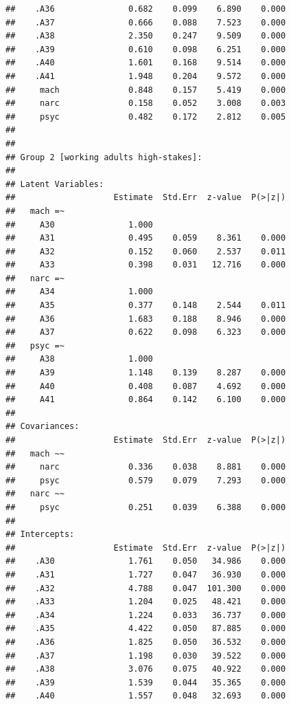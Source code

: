 \documentclass[
  english,
  man]{apa6}
\begin{document}
\begin{verbatim}
##    .A36               0.682    0.099    6.890    0.000
##    .A37               0.666    0.088    7.523    0.000
##    .A38               2.350    0.247    9.509    0.000
##    .A39               0.610    0.098    6.251    0.000
##    .A40               1.601    0.168    9.514    0.000
##    .A41               1.948    0.204    9.572    0.000
##     mach              0.848    0.157    5.419    0.000
##     narc              0.158    0.052    3.008    0.003
##     psyc              0.482    0.172    2.812    0.005
## 
## 
## Group 2 [working adults high-stakes]:
## 
## Latent Variables:
##                    Estimate  Std.Err  z-value  P(>|z|)
##   mach =~                                             
##     A30               1.000                           
##     A31               0.495    0.059    8.361    0.000
##     A32               0.152    0.060    2.537    0.011
##     A33               0.398    0.031   12.716    0.000
##   narc =~                                             
##     A34               1.000                           
##     A35               0.377    0.148    2.544    0.011
##     A36               1.683    0.188    8.946    0.000
##     A37               0.622    0.098    6.323    0.000
##   psyc =~                                             
##     A38               1.000                           
##     A39               1.148    0.139    8.287    0.000
##     A40               0.408    0.087    4.692    0.000
##     A41               0.864    0.142    6.100    0.000
## 
## Covariances:
##                    Estimate  Std.Err  z-value  P(>|z|)
##   mach ~~                                             
##     narc              0.336    0.038    8.881    0.000
##     psyc              0.579    0.079    7.293    0.000
##   narc ~~                                             
##     psyc              0.251    0.039    6.388    0.000
## 
## Intercepts:
##                    Estimate  Std.Err  z-value  P(>|z|)
##    .A30               1.761    0.050   34.986    0.000
##    .A31               1.727    0.047   36.930    0.000
##    .A32               4.788    0.047  101.300    0.000
##    .A33               1.204    0.025   48.421    0.000
##    .A34               1.224    0.033   36.737    0.000
##    .A35               4.422    0.050   87.885    0.000
##    .A36               1.825    0.050   36.532    0.000
##    .A37               1.198    0.030   39.522    0.000
##    .A38               3.076    0.075   40.922    0.000
##    .A39               1.539    0.044   35.365    0.000
##    .A40               1.557    0.048   32.693    0.000

\end{verbatim}
\end{document}
